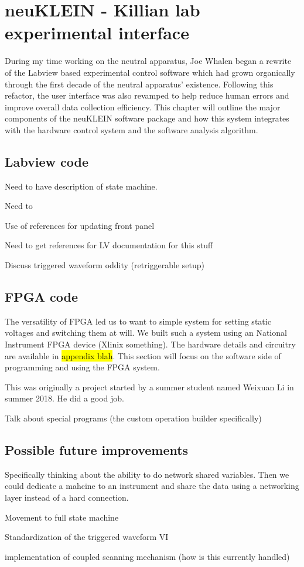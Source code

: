 \chapter{neuKLEIN - Killian lab experimental interface} 
\label{app:neuKLEIN}
During my time working on the neutral apparatus, Joe Whalen began a rewrite of the Labview based experimental control software which had grown organically through the first decade of the neutral apparatus' existence. Following this refactor, the user interface was also revamped to help reduce human errors and improve overall data collection efficiency. This chapter will outline the major components of the neuKLEIN software package and how this system integrates with the hardware control system and the software analysis algorithm.

\section{Labview code}
Need to have description of state machine.

Need to 

Use of references for updating front panel

Need to get references for LV documentation for this stuff

Discuss triggered waveform oddity (retriggerable setup)




\section{FPGA code}
The versatility of FPGA led us to want to simple system for setting static voltages and switching them at will. We built such a system using an National Instrument FPGA device (Xlinix something). The hardware details and circuitry are available in \hl{appendix blah}. This section will focus on the software side of programming and using the FPGA system.

This was originally a project started by a summer student named Weixuan Li in summer 2018. He did a good job.

Talk about special programs (the custom operation builder specifically)

\section{Possible future improvements}
Specifically thinking about the ability to do network shared variables. Then we could dedicate a mahcine to an instrument and share the data using a networking layer instead of a hard connection.

Movement to full state machine

Standardization of the triggered waveform VI

implementation of coupled scanning mechanism (how is this currently handled)



